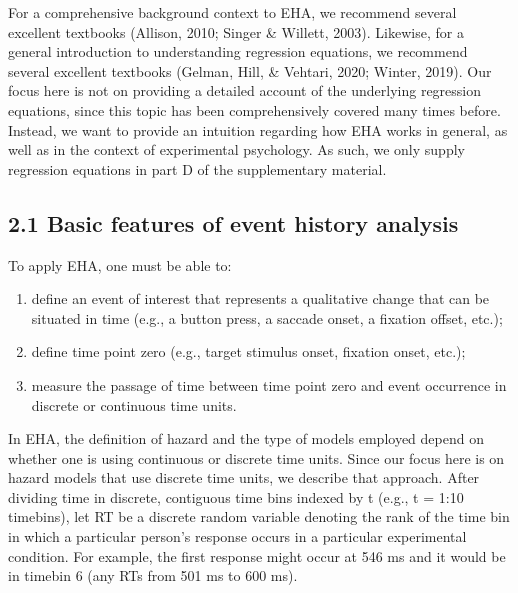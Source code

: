 \documentclass[
  man, donotrepeattitle,floatsintext]{apa6}
\begin{document}
For a comprehensive background context to EHA, we recommend several excellent textbooks (Allison, 2010; Singer \& Willett, 2003). Likewise, for a general introduction to understanding regression equations, we recommend several excellent textbooks (Gelman, Hill, \& Vehtari, 2020; Winter, 2019). Our focus here is not on providing a detailed account of the underlying regression equations, since this topic has been comprehensively covered many times before. Instead, we want to provide an intuition regarding how EHA works in general, as well as in the context of experimental psychology. As such, we only supply regression equations in part D of the supplementary material.

\subsection{2.1 Basic features of event history analysis}\label{basic-features-of-event-history-analysis}

To apply EHA, one must be able to:

\begin{enumerate}
\def\labelenumi{\arabic{enumi}.}
\item
  define an event of interest that represents a qualitative change that can be situated in time (e.g., a button press, a saccade onset, a fixation offset, etc.);
\item
  define time point zero (e.g., target stimulus onset, fixation onset, etc.);
\item
  measure the passage of time between time point zero and event occurrence in discrete or continuous time units.
\end{enumerate}

In EHA, the definition of hazard and the type of models employed depend on whether one is using continuous or discrete time units. Since our focus here is on hazard models that use discrete time units, we describe that approach. After dividing time in discrete, contiguous time bins indexed by t (e.g., t = 1:10 timebins), let RT be a discrete random variable denoting the rank of the time bin in which a particular person's response occurs in a particular experimental condition. For example, the first response might occur at 546 ms and it would be in timebin 6 (any RTs from 501 ms to 600 ms).
\end{document}
